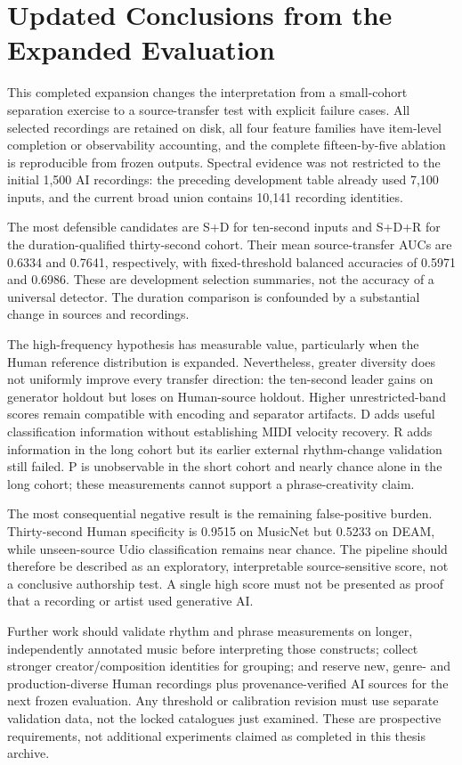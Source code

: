 \section{Updated Conclusions from the Expanded Evaluation}
\label{sec:expanded-final-conclusions}

This completed expansion changes the interpretation from a small-cohort
separation exercise to a source-transfer test with explicit failure cases.
All selected recordings are retained on disk, all four feature families have
item-level completion or observability accounting, and the complete fifteen-by-five
ablation is reproducible from frozen outputs. Spectral evidence was not restricted
to the initial 1,500 AI recordings: the preceding development table already used
7,100 inputs, and the current broad union contains 10,141 recording identities.

The most defensible candidates are S+D for ten-second inputs and S+D+R for the
duration-qualified thirty-second cohort. Their mean source-transfer AUCs are
0.6334 and 0.7641, respectively, with fixed-threshold balanced accuracies of
0.5971 and 0.6986. These are development selection summaries, not the accuracy
of a universal detector. The duration comparison is confounded by a substantial
change in sources and recordings.

The high-frequency hypothesis has measurable value, particularly when the Human
reference distribution is expanded. Nevertheless, greater diversity does not
uniformly improve every transfer direction: the ten-second leader gains on
generator holdout but loses on Human-source holdout. Higher unrestricted-band
scores remain compatible with encoding and separator artifacts. D adds useful
classification information without establishing MIDI velocity recovery. R adds
information in the long cohort but its earlier external rhythm-change validation
still failed. P is unobservable in the short cohort and nearly chance alone in
the long cohort; these measurements cannot support a phrase-creativity claim.

The most consequential negative result is the remaining false-positive burden.
Thirty-second Human specificity is 0.9515 on MusicNet but 0.5233 on DEAM, while
unseen-source Udio classification remains near chance. The pipeline should
therefore be described as an exploratory, interpretable source-sensitive score,
not a conclusive authorship test. A single high score must not be presented as
proof that a recording or artist used generative AI.

Further work should validate rhythm and phrase measurements on longer,
independently annotated music before interpreting those constructs; collect
stronger creator/composition identities for grouping; and reserve new,
genre- and production-diverse Human recordings plus provenance-verified AI
sources for the next frozen evaluation. Any threshold or calibration revision
must use separate validation data, not the locked catalogues just examined.
These are prospective requirements, not additional experiments claimed as
completed in this thesis archive.
